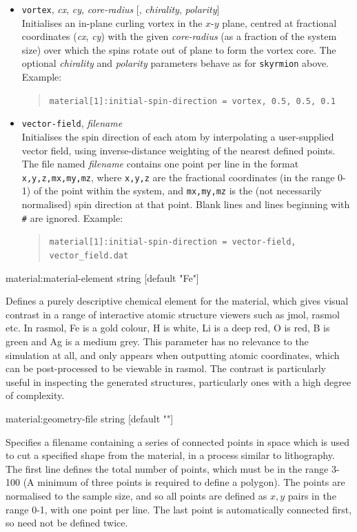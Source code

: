 \begin{itemize}
\item \verb|vortex|, \emph{cx}, \emph{cy}, \emph{core-radius} [, \emph{chirality}, \emph{polarity}] \\
Initialises an in-plane curling vortex in the $x$-$y$ plane, centred at fractional coordinates (\emph{cx}, \emph{cy}) with the given \emph{core-radius} (as a fraction of the system size) over which the spins rotate out of plane to form the vortex core. The optional \emph{chirality} and \emph{polarity} parameters behave as for \verb|skyrmion| above. Example:
\begin{quote}
\verb|material[1]:initial-spin-direction = vortex, 0.5, 0.5, 0.1|
\end{quote}

\item \verb|vector-field|, \emph{filename} \\
Initialises the spin direction of each atom by interpolating a user-supplied vector field, using inverse-distance weighting of the nearest defined points. The file named \emph{filename} contains one point per line in the format \verb|x,y,z,mx,my,mz|, where \verb|x,y,z| are the fractional coordinates (in the range 0-1) of the point within the system, and \verb|mx,my,mz| is the (not necessarily normalised) spin direction at that point. Blank lines and lines beginning with \verb|#| are ignored. Example:
\begin{quote}
\verb|material[1]:initial-spin-direction = vector-field, vector_field.dat|
\end{quote}

\end{itemize}

{\zicf material:material-element string [default "Fe"]} Defines a purely descriptive chemical element for the material, which gives visual contrast in a range of interactive atomic structure viewers such as jmol, rasmol etc. In rasmol, Fe is a gold colour, H is white, Li is a deep red, O is red, B is green and Ag is a medium grey. This parameter has no relevance to the simulation at all, and only appears when outputting atomic coordinates, which can be post-processed to be viewable in rasmol. The contrast is particularly useful in inspecting the generated structures, particularly ones with a high degree of complexity.

{\zicf material:geometry-file string [default ""]} Specifies a filename containing a series of connected points in space which is used to cut a specified shape from the material, in a process similar to lithography. The first line defines the total number of points, which must be in the range 3-100 (A minimum of three points is required to define a polygon). The points are normalised to the sample size, and so all points are defined as $x,y$ pairs in the range 0-1, with one point per line. The last point is automatically connected first, so need not be defined twice.

